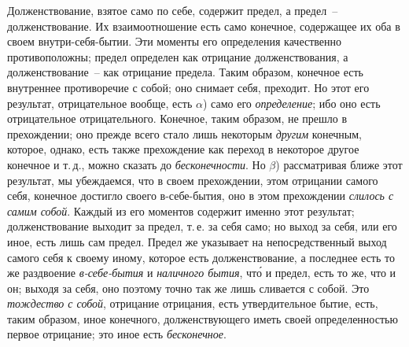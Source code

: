 Долженствование, взятое само по себе, содержит предел,
а предел~-- долженствование. Их взаимоотношение
есть само конечное, содержащее их оба в своем внутри-себя-бытии.
Эти моменты его определения качественно
противоположны; предел определен как отрицание долженствования,
а долженствование~-- как отрицание предела.
Таким образом, конечное есть внутреннее противоречие
с собой; оно снимает себя, преходит. Но этот его результат,
отрицательное вообще, есть $\alpha$) само его \emph{определение};
ибо оно есть отрицательное отрицательного. Конечное,
таким образом, не прешло в прехождении; оно
прежде всего стало лишь некоторым \emph{другим} конечным,
которое, однако, есть также прехождение как переход в
некоторое другое конечное и т.\,д., можно сказать до \emph{бесконечности}.
Но $\beta$) рассматривая ближе этот результат,
мы убеждаемся, что в своем прехождении, этом отрицании
самого себя, конечное достигло своего в-себе-бытия, оно
в этом прехождении \emph{слилось с самим собой}. Каждый из
его моментов содержит именно этот результат; долженствование
выходит за предел, т.\,е. за себя само; но выход
за себя, или его иное, есть лишь сам предел. Предел же
указывает на непосредственный выход самого себя к
своему иному, которое есть долженствование, а последнее
есть то же раздвоение \emph{в-себе-бытия} и \emph{наличного бытия},
чт\'о и предел, есть то же, что и он; выходя за себя,
оно поэтому точно так же лишь сливается с собой. Это
\emph{тождество с собой}, отрицание отрицания, есть утвердительное
бытие, есть, таким образом, иное конечного, долженствующего
иметь своей определенностью первое отрицание;
это иное есть \emph{бесконечное}.


